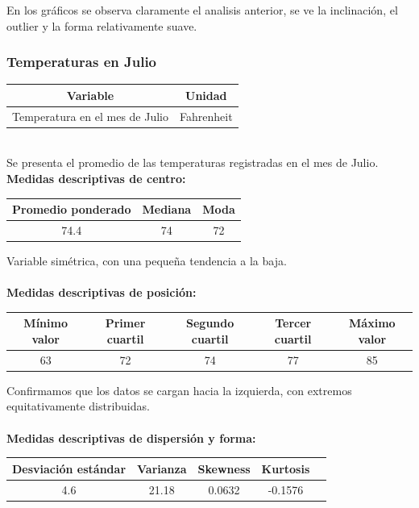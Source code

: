 \documentclass[11pt]{article}
\begin{document}
En los gráficos se observa claramente el analisis anterior, se ve la inclinación, el outlier y la forma relativamente suave.

\subsubsection{Temperaturas en Julio}

\begin{center}
\begin{tabular}{|c|c|}
    \hline
    Variable & Unidad  \\ \hline
    Temperatura en el mes de Julio & Fahrenheit \\
    \hline
\end{tabular}
\end{center}
\\
Se presenta el promedio de las temperaturas registradas en el mes de Julio.
\\

\textbf{Medidas descriptivas de centro:}

\begin{center}
\begin{tabular}{|c|c|c|}
    \hline
    Promedio ponderado & Mediana & Moda \\ \hline
    74.4  & 74 & 72 \\
    \hline
\end{tabular}
\end{center}

Variable simétrica, con una pequeña tendencia a la baja.
\\
\\
\textbf{Medidas descriptivas de posición:}

\begin{center}
\begin{tabular}{|c|c|c|c|c|}
    \hline
    Mínimo valor & Primer cuartil & Segundo cuartil & Tercer cuartil & Máximo valor\\ \hline
    63 & 72 & 74 & 77 & 85\\
    \hline
\end{tabular}
\end{center}

Confirmamos que los datos se cargan hacia la izquierda, con extremos equitativamente distribuidas.
\\
\\
\textbf{Medidas descriptivas de dispersión y forma:}

\begin{center}
\begin{tabular}{|c|c|c|c|c|}
    \hline
    Desviación estándar  & Varianza & Skewness & Kurtosis\\ \hline
    4.6 & 21.18 & 0.0632 & -0.1576\\
    \hline
\end{tabular}
\end{center}
\end{document}
